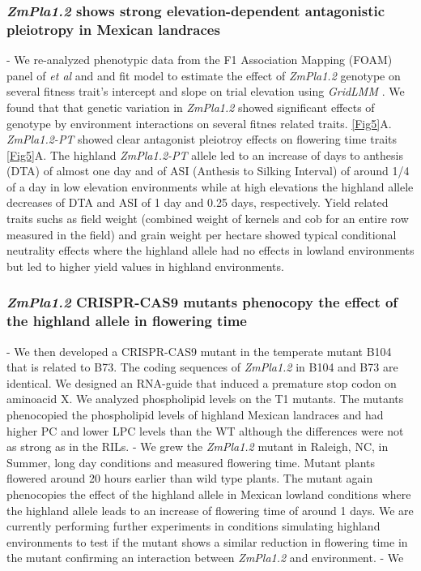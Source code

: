 \documentclass[9pt,twocolumn,twoside,lineno]{gsajnl}
\begin{document}
\subsubsection{\textit{ZmPla1.2} shows strong elevation-dependent antagonistic pleiotropy in Mexican landraces}
- We re-analyzed phenotypic data from the F1 Association Mapping (FOAM) panel of \textit{et al} \cite{Romero_Navarro2017-cn} and \cite{Gates2019-xu} and fit model to estimate the effect of \textit{ZmPla1.2} genotype on several fitness trait's intercept and slope on trial elevation using \textit{GridLMM} \cite{GridLMM2019}. 
We found that that genetic variation in \textit{ZmPla1.2} showed significant effects of genotype by environment interactions on several fitnes related traits. \ref{Fig5}A. 
\textit{ZmPla1.2-PT} showed clear antagonist pleiotroy effects on flowering time traits \ref{Fig5}A. 
The highland \textit{ZmPla1.2-PT} allele  led to an increase of days to anthesis (DTA) of almost one day and of ASI (Anthesis to Silking Interval) of around 1/4 of a day in low elevation environments while at high elevations the highland allele decreases of DTA and ASI of 1 day and 0.25 days, respectively.
Yield related traits suchs as field weight (combined weight of kernels and cob for an entire row measured in the field) and grain weight per hectare showed typical conditional neutrality effects where the highland allele had no effects in lowland environments but led to higher yield values in highland environments.
\subsubsection{\textit{ZmPla1.2} CRISPR-CAS9 mutants phenocopy the effect of the highland allele in flowering time}
- We then developed a CRISPR-CAS9 mutant in the temperate mutant B104 that is related to B73. The coding sequences of \textit{ZmPla1.2} in B104 and B73 are identical. 
We designed an RNA-guide that induced a premature stop codon on aminoacid X.
We analyzed phospholipid levels on the T1 mutants. The mutants phenocopied the phospholipid levels of highland Mexican landraces and had higher PC and lower LPC levels than the WT although the differences were not as strong as in the RILs. 
- We  grew the \textit{ZmPla1.2} mutant in Raleigh, NC, in Summer, long day conditions and measured flowering time. 
Mutant plants flowered around 20 hours earlier than wild type plants. 
The mutant again phenocopies the effect of the highland allele in Mexican lowland conditions where the highland allele leads to an increase of flowering time of around 1 days. 
We are currently performing further experiments in conditions simulating highland environments to test if the mutant shows a similar reduction in flowering time in the mutant confirming an interaction between \textit{ZmPla1.2} and environment.
- We 
\end{document}
